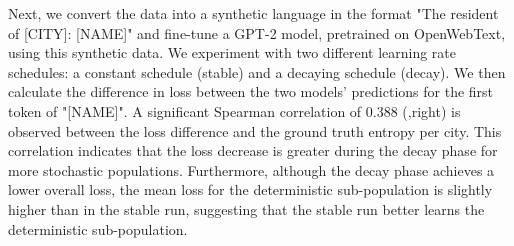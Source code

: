 Next, we convert the data into a synthetic language in the format "The resident of [CITY]: [NAME]" and fine-tune a GPT-2 model, pretrained on OpenWebText, using this synthetic data. We experiment with two different learning rate schedules: a constant schedule (stable) and a decaying schedule (decay).
We then calculate the difference in loss between the two models' predictions for the first token of "[NAME]". A significant Spearman correlation of 0.388 (,right) is observed between the loss difference and the ground truth entropy per city. This correlation indicates that the loss decrease is greater during the decay phase for more stochastic populations. Furthermore, although the decay phase achieves a lower overall loss, the mean loss for the deterministic sub-population is slightly higher than in the stable run, suggesting that the stable run better learns the deterministic sub-population.

